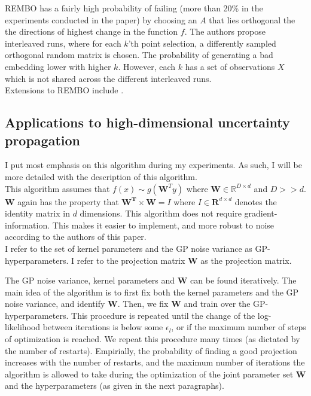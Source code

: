 REMBO has a fairly high probability of failing (more than 20\% in the experiments conducted in the paper) by choosing an $A$ that lies orthogonal the the directions of highest change in the function $f$.
The authors propose interleaved runs, where for each $k$'th point selection, a differently sampled orthogonal random matrix is chosen. 
The probability of generating a bad embedding lower with higher $k$.
However, each $k$ has a set of observations $X$ which is not shared across the different interleaved runs. \\
Extensions to REMBO include \citep{RemboExtension}.

\subsection{Applications to high-dimensional uncertainty propagation}
I put most emphasis on this algorithm during my experiments. 
As such, I will be more detailed with the description of this algorithm. \\

\citep{Tripathy} This algorithm assumes that  $f(x) \sim g( \mathbf{W}^T y)$ where $ \mathbf{W} \in \mathbb{R}^{D \times d} $ and $D >> d$.
$ \mathbf{W} $ again has the property that $\mathbf{W^T}  \times \mathbf{W} = I$ where $I \in \mathbf{R}^{d \times d}$ denotes the identity matrix in $d$ dimensions. 
This algorithm does not require gradient-information.
This makes it easier to implement, and more robust to noise according to the authors of this paper. \\


I refer to the set of kernel parameters and the GP noise variance as GP-hyperparameters.
I refer to the projection matrix $ \mathbf{W} $ as the projection matrix.

The GP noise variance, kernel parameters and  $ \mathbf{W} $ can be found iteratively.
The main idea of the algorithm is to first fix both the kernel parameters and the GP noise variance, and identify $ \mathbf{W} $.
Then, we fix $ \mathbf{W} $ and train over the GP-hyperparameters.
This procedure is repeated until the change of the log-likelihood between iterations is below some $ \epsilon_l $, or if the maximum number of steps of optimization is reached.
We repeat this procedure many times (as dictated by the number of restarts).
Empirially, the probability of finding a good projection increases with the number of restarts, and the maximum number of iterations the algorithm is allowed to take during the optimization of the joint parameter set $\mathbf{W}$ and the hyperparameters (as given in the next paragraphs).\\

